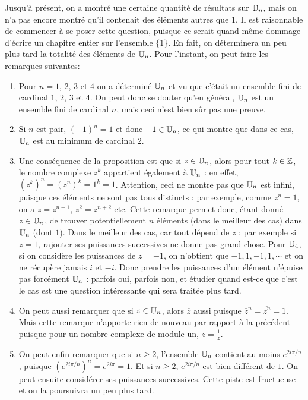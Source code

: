 Jusqu'à présent, on a montré une certaine quantité de résultats sur $\mathbb{U}_n$, mais on n'a pas encore montré qu'il contenait des éléments autres que $1$. Il est raisonnable de commencer à se poser cette question, puisque ce serait quand même dommage d'écrire un chapitre entier sur l'ensemble $\{1\}$. En fait, on déterminera un peu plus tard la totalité des éléments de $\mathbb{U}_n$. Pour l'instant, on peut faire les remarques suivantes:
\begin{enumerate}
\item Pour $n=1$, $2$, $3$ et $4$ on a déterminé $\mathbb{U}_n$ et vu que c'était un ensemble fini de cardinal $1$, $2$, $3$ et $4$. On peut donc se douter qu'en général, $\mathbb{U}_n$ est un ensemble fini de cardinal $n$, mais ceci n'est bien sûr pas une preuve.
\item Si $n$ est pair, $(-1)^n=1$ et donc $-1 \in\mathbb{U}_n$, ce qui montre que dans ce cas, $\mathbb{U}_n$ est au minimum de cardinal $2$.
\item Une conséquence de la proposition est que si $z\in\mathbb{U}_n$, alors pour tout $k\in\mathbb{Z}$, le nombre complexe $z^k$ appartient également à $\mathbb{U}_n$ : en effet, $\left(z^k\right)^n=\left(z^n\right)^k=1^k=1$. Attention, ceci ne montre pas que $\mathbb{U}_n$ est infini, puisque ces éléments ne sont pas tous distincts : par exemple, comme $z^n=1$, on a $z=z^{n+1}$, $z^2=z^{n+2}$ etc. Cette remarque permet donc, étant donné $z\in\mathbb{U}_n$, de trouver potentiellement $n$ éléments (dans le meilleur des cas) dans $\mathbb{U}_n$ (dont $1$). Dans le meilleur des cas, car tout dépend de $z$ : par exemple si $z=1$, rajouter ses puissances successives ne donne pas grand chose. Pour $\mathbb{U}_4$, si on considère les puissances de $z=-1$, on n'obtient que $-1, 1, -1, 1, \cdots$ et on ne récupère jamais $i$ et $-i$. Donc prendre les puissances d'un élément n'épuise pas forcément $\mathbb{U}_n$ : parfois oui, parfois non, et étudier quand est-ce que c'est le cas est une question intéressante qui sera traitée plus tard.
\item On peut aussi remarquer que si $z\in\mathbb{U}_n$, alors $\overline z$ aussi puisque $\overline z^n=\overline{z^n}=1$. Mais cette remarque n'apporte rien de nouveau par rapport à la précédent puisque pour un nombre complexe de module un, $\overline z = \frac1z$.
\item On peut enfin remarquer que si $n\geq 2$, l'ensemble $\mathbb{U}_n$ contient au moins $e^{2i\pi/n}$, puisque $\left(e^{2i\pi/n}\right)^n=e^{2i\pi}=1$. Et si $n\geq 2$, $e^{2i\pi/n}$ est bien différent de $1$. On peut ensuite considérer ses puissances successives. Cette piste est fructueuse et on la poursuivra un peu plus tard. 
\end{enumerate}


